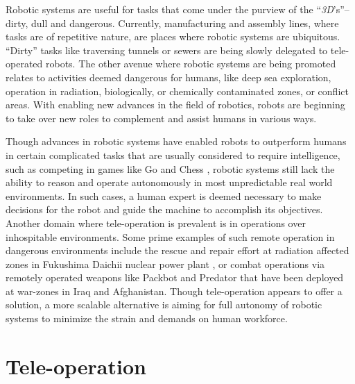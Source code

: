 \documentclass {udthesis}
\begin{document}
Robotic systems are useful for tasks that come under the purview of the ``\emph{3D}'s''--dirty, dull and dangerous. 
Currently, manufacturing and assembly lines, where tasks are of repetitive nature, are places where robotic systems are ubiquitous. ``Dirty'' tasks like traversing tunnels or sewers are being slowly delegated to tele-operated robots. 
The other avenue where robotic systems are being promoted relates to activities deemed dangerous for humans, like deep sea exploration, operation in radiation, biologically, or chemically contaminated zones, or conflict areas. With enabling new advances in the field of robotics, robots are beginning to take over new roles to complement and assist humans in various ways.

Though advances in robotic systems have enabled robots to outperform humans in certain complicated tasks that are usually considered to require intelligence, such as competing in games like Go \cite{deepmind} and Chess \cite{deepblue}, 
robotic systems still lack the ability to reason and operate
autonomously in most unpredictable real world environments. 
In such cases, a human expert is deemed necessary to make decisions for the robot and guide the machine
to accomplish its objectives. Another domain where tele-operation is prevalent is in operations over inhospitable environments. Some prime examples of such remote operation in
dangerous environments include the rescue and repair effort at radiation affected zones in Fukushima Daichii nuclear power plant \cite{fukushima}, or combat operations via remotely operated weapons like Packbot \cite{packbot} and Predator \cite{predator} that have been deployed
at war-zones in Iraq and Afghanistan. Though tele-operation appears to offer a solution, a more scalable alternative
is aiming for full autonomy of robotic systems to minimize the strain and demands on human workforce.

\section{Tele-operation}
\end{document}
